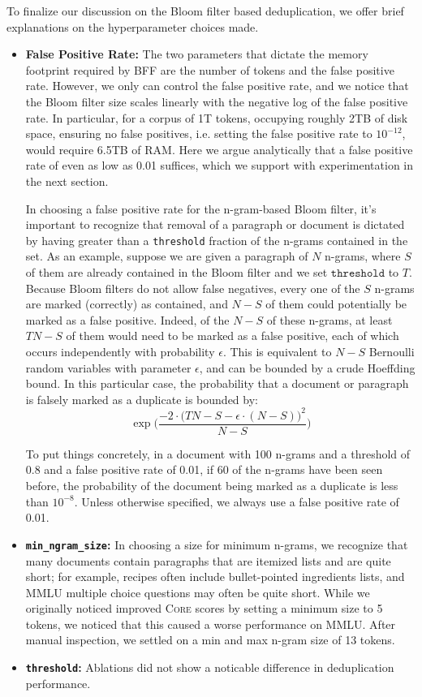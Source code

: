 \documentclass{article}
\newcommand{\lowvar}{\textsc{Core}\xspace}
\begin{document}
To finalize our discussion on the Bloom filter based deduplication, we offer brief explanations on the hyperparameter choices made. \begin{itemize}
    \item \textbf{False Positive Rate:} The two parameters that dictate the memory footprint required by BFF are the number of tokens and the false positive rate. However, we only can control the false positive rate, and we notice that the Bloom filter size scales linearly with the negative log of the false positive rate. In particular, for a corpus of 1T tokens, occupying roughly 2TB of disk space, ensuring no false positives, i.e. setting the false positive rate to $10^{-12}$, would require 6.5TB of RAM. Here we argue analytically that a false positive rate of even as low as 0.01 suffices, which we support with experimentation in the next section.

    In choosing a false positive rate for the n-gram-based Bloom filter, it's important to recognize that removal of a paragraph or document is dictated by having greater than a \texttt{threshold} fraction of the n-grams contained in the set. As an example, suppose we are given a paragraph of $N$ n-grams, where $S$ of them are already contained in the Bloom filter and we set $\texttt{threshold}$ to $T$. Because Bloom filters do not allow false negatives, every one of the $S$ n-grams are marked (correctly) as contained, and $N-S$ of them could potentially be marked as a false positive. Indeed, of the $N-S$ of these n-grams, at least $TN - S$ of them would need to be marked as a false positive, each of which occurs independently with probability $\epsilon$. This is equivalent to $N-S$ Bernoulli random variables with parameter $\epsilon$, and can be bounded by a crude Hoeffding bound. In this particular case, the probability that a document or paragraph is falsely marked as a duplicate is bounded by:
    \[\exp\Big(\frac{-2\cdot \big(TN - S - \epsilon\cdot (N-S)\big)^2}{N-S}\Big)\]

    To put things concretely, in a document with 100 n-grams and a threshold of 0.8 and a false positive rate of 0.01, if 60 of the n-grams have been seen before, the probability of the document being marked as a duplicate is less than $10^{-8}$. Unless otherwise specified, we always use a false positive rate of 0.01.
    \item \textbf{\texttt{min\_ngram\_size}:} In choosing a size for minimum n-grams, we recognize that many documents contain paragraphs that are itemized lists and are quite short; for example, recipes often include bullet-pointed ingredients lists, and MMLU multiple choice questions may often be quite short. While we originally noticed improved \lowvar scores by setting a minimum size to 5 tokens, we noticed that this caused a worse performance on MMLU. After manual inspection, we settled on a min and max n-gram size of 13 tokens.
    \item \textbf{\texttt{threshold}:} Ablations did not show a noticable difference in deduplication performance.
\end{itemize}
\end{document}
